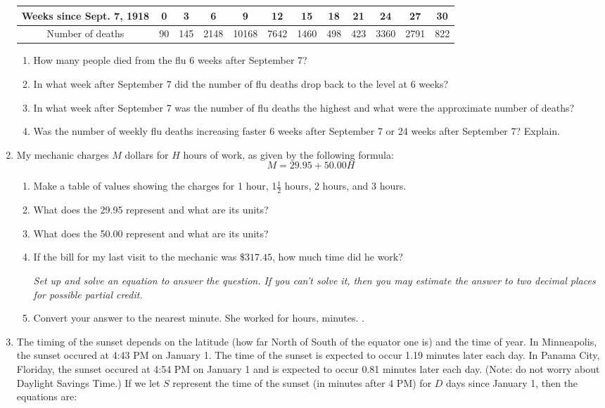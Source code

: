 \documentclass[12pt]{article}
\begin{document}
\begin{enumerate}
\begin{tabular} {|c|c|c|c|c |c|c|c|c|c |c|c|} \hline
Weeks since Sept. 7, 1918 & 0 & 3 & 6  & 9  & 12  & 15  & 18 & 21  & 24  & 27  & 30 \\ \hline
Number of deaths &90 & 145 & 2148 & 10168 & 7642 & 1460 & 498 & 423 & 3360 & 2791 & 822 \\ \hline
\end{tabular}

\begin{enumerate}
\item How many people died from the flu 6 weeks after September 7?
\vfill
\item In what week after September 7 did the number of flu deaths drop back to the level at 6 weeks?
\vfill
\item In what week after September 7 was the number of flu deaths the highest and what were the approximate number of deaths?
\vfill
\item Was the number of weekly flu deaths increasing faster 6 weeks after September 7 or 24 weeks after September 7?  Explain.
\vfill
\end{enumerate}

\newpage %

\item My mechanic charges $M$ dollars for $H$ hours of work, as given by the following formula:
$$M = 29.95 + 50.00H$$

\begin{enumerate}
\item Make a table of values showing the charges for 1 hour, 1$\frac{1}{2}$ hours, 2 hours, and 3 hours.
\vfill
\item What does the 29.95 represent and what are its units?
\vfill
\item What does the 50.00 represent and what are its units?
\vfill
\item If the bill for my last visit to the mechanic was $\$317.45$, how much time did he work?

\emph{Set up and solve an equation to answer the question.  If you can't solve it, then you may estimate the answer to two decimal places for possible partial credit.}
\vfill
\vfill
\vfill
\item Convert your answer to the nearest minute.
\vfill
She worked for \hrulefill hours, \hrulefill minutes. \hspace{3in}.
\end{enumerate}

\newpage %
\item The timing of the sunset depends on the latitude (how far North of South of the equator one is) and the time of year.  In Minneapolis, the sunset occured at 4:43 PM on January 1.  The time of the sunset is expected to occur 1.19 minutes later each day.  In Panama City, Floriday, the sunset occured at 4:54 PM on January 1 and is expected to occur 0.81 minutes later each day.  (Note: do not worry about Daylight Savings Time.) If we let $S$ represent the time of the sunset (in minutes after 4 PM) for $D$ days since January 1, then the equations are:


\end{enumerate}
\end{document}
